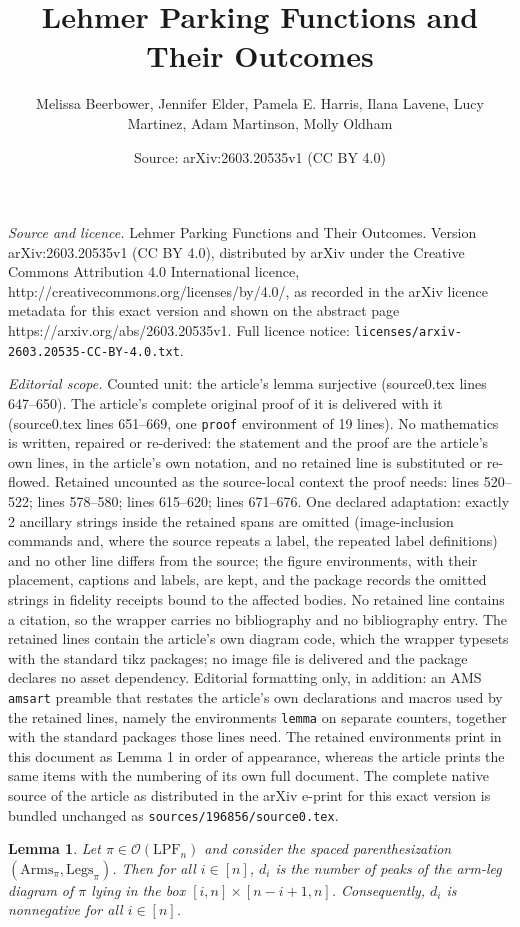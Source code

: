 \documentclass[10pt,a4paper]{amsart}
\title{Lehmer Parking Functions and Their Outcomes}
\author{Melissa Beerbower, Jennifer Elder, Pamela E. Harris, Ilana Lavene, Lucy Martinez, Adam Martinson, Molly Oldham}
\date{Source: arXiv:2603.20535v1 (CC BY 4.0)}
\newtheorem{lemma}{Lemma}
\newcommand{\IT}{\mathrm{LPF}}
\newcommand{\Out}{\mathcal{O}}
\newcommand{\arms}{\mathrm{Arms}}
\newcommand{\legs}{\mathrm{Legs}}
\begin{document}
\maketitle

\noindent\emph{Source and licence.} Lehmer Parking Functions and Their Outcomes. Version arXiv:2603.20535v1 (CC BY 4.0), distributed by arXiv under the Creative Commons Attribution 4.0 International licence, http://creativecommons.org/licenses/by/4.0/, as recorded in the arXiv licence metadata for this exact version and shown on the abstract page https://arxiv.org/abs/2603.20535v1. Full licence notice: \texttt{licenses/arxiv-2603.20535-CC-BY-4.0.txt}.\par\smallskip

\noindent\textit{Editorial scope.} Counted unit: the article's lemma surjective (source0.tex lines 647--650). The article's complete original proof of it is delivered with it (source0.tex lines 651--669, one \texttt{proof} environment of 19 lines). No mathematics is written, repaired or re-derived: the statement and the proof are the article's own lines, in the article's own notation, and no retained line is substituted or re-flowed.  Retained uncounted as the source-local context the proof needs: lines 520--522; lines 578--580; lines 615--620; lines 671--676.  One declared adaptation: exactly 2 ancillary strings inside the retained spans are omitted (image-inclusion commands and, where the source repeats a label, the repeated label definitions) and no other line differs from the source; the figure environments, with their placement, captions and labels, are kept, and the package records the omitted strings in fidelity receipts bound to the affected bodies.  No retained line contains a citation, so the wrapper carries no bibliography and no bibliography entry.  The retained lines contain the article's own diagram code, which the wrapper typesets with the standard tikz packages; no image file is delivered and the package declares no asset dependency.  Editorial formatting only, in addition: an AMS \texttt{amsart} preamble that restates the article's own declarations and macros used by the retained lines, namely the environments \texttt{lemma} on separate counters, together with the standard packages those lines need.  The retained environments print in this document as Lemma 1 in order of appearance, whereas the article prints the same items with the numbering of its own full document.  The complete native source of the article as distributed in the arXiv e-print for this exact version is bundled unchanged as \texttt{sources/196856/source0.tex}.
\begin{lemma}\label{lem:d_i = leg intersections}
    Let $\pi\in \Out (\IT_n)$ and consider the spaced parenthesization $(\arms_\pi,\legs_\pi)$. Then for all $i\in [n]$, $d_i$ is the number of peaks of the arm-leg diagram of $\pi$ lying in the box $[i,n]\times[n-i+1,n]$. Consequently, $d_i$ is nonnegative for all $i\in[n]$.
\end{lemma}
\end{document}
